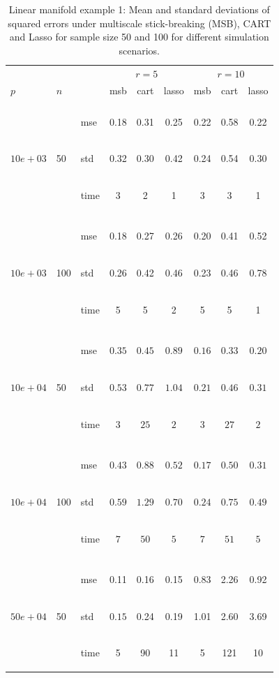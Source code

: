 \documentclass{article} %
\newcommand{\efoo}{\end{footnotesize}}
\newcommand{\bfoo}{\begin{footnotesize}}
\begin{document}
\begin{table}[t]
\caption{Linear manifold example 1: Mean and standard deviations of squared errors under multiscale stick-breaking (MSB), CART and Lasso for sample size 50 and 100 for different simulation scenarios.}\label{table:linear1}
\vskip 0.15in
\begin{center}
\begin{small}
\begin{sc}
\begin{tabular}{lllcccccc}
\hline
&&&\multicolumn{3}{c}{$r=5$}&\multicolumn{3}{c}{$r=10$}\\
$p$&$n$& & msb&cart&lasso & msb&cart&lasso \\
\\
\multirow{3}{*}{$10e+03$}&\multirow{3}{*}{50}&\bfoo mse\efoo&0.18&0.31&0.25&0.22&0.58&0.22\\
&&\bfoo std\efoo &0.32&0.30&0.42&0.24&0.54&0.30\\
&&\bfoo time\efoo &3&2&1&3&3&1\\

\\
\multirow{3}{*}{$10e+03$}&\multirow{3}{*}{100}&\bfoo mse\efoo&0.18&0.27&0.26&0.20&0.41&0.52\\
&&\bfoo std\efoo & 0.26&0.42&0.46&0.23&0.46&0.78\\
&&\bfoo time\efoo &5&5& 2&5&5&1\\

\\
\multirow{3}{*}{$10e+04$}&\multirow{3}{*}{50}&\bfoo mse\efoo&$0.35$&$0.45$&$0.89$&$0.16$&$0.33$&$0.20$\\
&&\bfoo std\efoo &$0.53$ &$0.77$&$1.04$&$0.21$&$0.46$&$0.31$\\
&&\bfoo time\efoo &$3$&$25$&$2$&$3$&$27$&$2$\\
\\
\multirow{3}{*}{$10e+04$}&\multirow{3}{*}{100}&\bfoo mse\efoo&$0.43$&$0.88$&$0.52$&$0.17$&$0.50$&$0.31$\\
&&\bfoo std\efoo &$0.59$ &$1.29$&$0.70$&$0.24$ &$0.75$&$0.49$\\
&&\bfoo time\efoo &$7$&$50$&$5$&$7$&$51$&$5$\\
\\
\multirow{3}{*}{$50e+04$}&\multirow{3}{*}{50}&\bfoo mse\efoo&0.11&0.16&0.15&0.83&2.26&0.92\\
&&\bfoo std\efoo&$0.15$ &0.24&0.19&1.01&2.60&3.69\\
&&\bfoo time\efoo &5&90&11&5&121&10\\



\end{tabular}
\end{sc}
\end{small}
\end{center}
\end{table}
\end{document}

